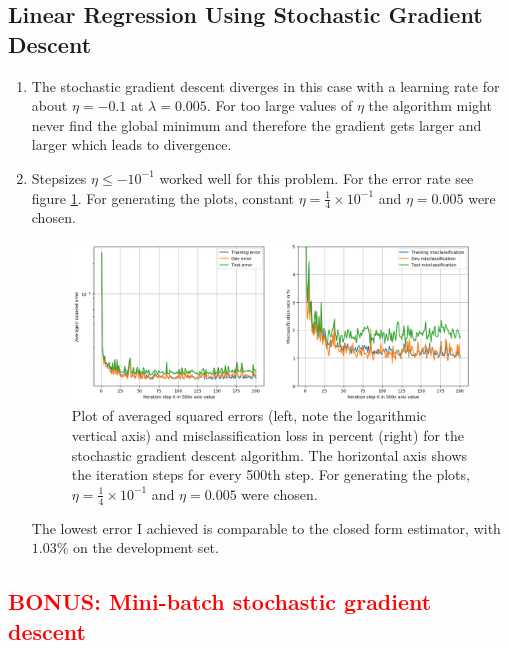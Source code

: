 \documentclass[12pt]{article}
\begin{document}
\subsection{Linear Regression Using Stochastic Gradient Descent}

\begin{enumerate}
	\item The stochastic gradient descent diverges in this case with a learning rate for about $\eta=-0.1$ at $\lambda=0.005$. For too large values of $\eta$ the algorithm might never find the global minimum and therefore the gradient gets larger and larger which leads to divergence. 
	\item  Stepsizes $\eta \le -10^{-1} $ worked well for this problem. For the error rate see figure \ref{fig:1.3}. For generating the plots, constant $\eta = \frac{1}{4}\times 10^{-1}$ and $\eta=0.005$ were chosen.
	\begin{figure}[h!]
		\centering
		\includegraphics[width=0.85\linewidth]{./Problem_1/Problem_1.3.png}
		\caption{Plot of averaged squared errors (left, note the logarithmic vertical axis) and misclassification loss in percent (right) for the stochastic gradient descent algorithm. The horizontal axis shows the iteration steps for every 500th step. For generating the plots, $\eta = \frac{1}{4}\times 10^{-1}$ and $\eta=0.005$ were chosen.}
		\label{fig:1.3}
	\end{figure}
	The lowest error I achieved is comparable to the closed form estimator, with $1.03\%$ on the development set. 

\end{enumerate}

\subsection{\textcolor{red}{BONUS: Mini-batch stochastic gradient descent}}
\end{document}
